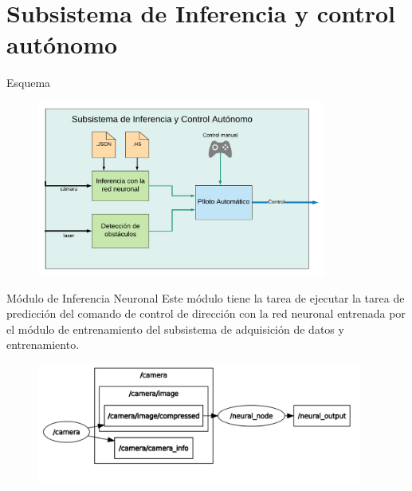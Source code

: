 \documentclass[10pt]{beamer}
\begin{document}
\section{Subsistema de Inferencia y control autónomo}
\begin{frame}{Esquema}
    \begin{figure}[!h] 
        \centering
        \includegraphics[width=0.85\textwidth]{../img/inferencia_esq}
        \end{figure}
\end{frame}


\begin{frame}{Módulo de Inferencia Neuronal}
    Este módulo tiene la tarea de ejecutar la tarea de predicción del comando de control de dirección con la red neuronal 
    entrenada por el módulo de entrenamiento del subsistema de adquisición de datos y entrenamiento.
    \begin{figure}[!h] 
        \centering
        \includegraphics[width=0.95\textwidth]{../img/nodosneural}
        \end{figure}
\end{frame}
\end{document}
